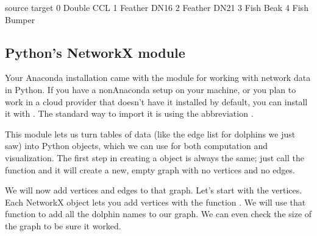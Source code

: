 \documentclass[letterpaper,10pt,english]{sphinxmanual}
\begin{document}
\begin{sphinxVerbatim}[commandchars=\\\{\}]
    source  target
0   Double     CCL
1  Feather    DN16
2  Feather    DN21
3     Fish    Beak
4     Fish  Bumper
\end{sphinxVerbatim}


\subsection{Python’s NetworkX module}
\label{\detokenize{chapter-15-networks:python-s-networkx-module}}
Your Anaconda installation came with the  module for working with network data in Python.  If you have a non\sphinxhyphen{}Anaconda setup on your machine, or you plan to work in a cloud provider that doesn’t have it installed by default, you can install it with .  The standard way to import it is using the abbreviation .

\begin{sphinxVerbatim}[commandchars=\\\{\}]
   
\end{sphinxVerbatim}

This module lets us turn tables of data (like the edge list for dolphins we just saw) into Python  objects, which we can use for both computation and visualization.  The first step in creating a  object is always the same; just call the  function and it will create a new, empty graph with no vertices and no edges.

\begin{sphinxVerbatim}[commandchars=\\\{\}]
  
\end{sphinxVerbatim}

We will now add vertices and edges to that graph.  Let’s start with the vertices.  Each NetworkX  object lets you add vertices with the function .  We will use that function to add all the dolphin names to our graph.  We can even check the size of the graph to be sure it worked.

\begin{sphinxVerbatim}[commandchars=\\\{\}]
    
                        
\end{sphinxVerbatim}
\end{document}
